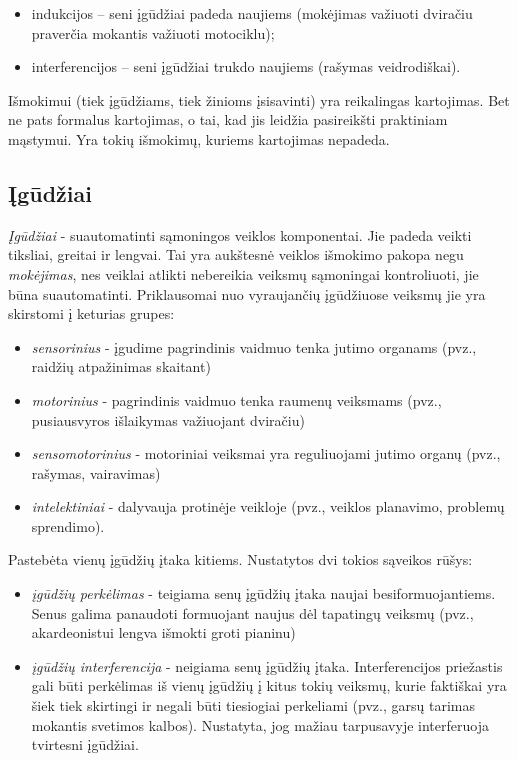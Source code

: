 \begin{itemize}
  \item indukcijos – seni įgūdžiai padeda naujiems (mokėjimas važiuoti
    dviračiu praverčia mokantis važiuoti motociklu);
  \item interferencijos – seni įgūdžiai trukdo naujiems (rašymas 
    veidrodiškai).
\end{itemize}


Išmokimui (tiek įgūdžiams, tiek žinioms įsisavinti) yra reikalingas 
kartojimas. Bet ne pats formalus kartojimas, o tai, kad jis leidžia
pasireikšti praktiniam mąstymui. Yra tokių išmokimų, kuriems kartojimas
nepadeda.

\subsection{Įgūdžiai}

\emph{Įgūdžiai} - suautomatinti sąmoningos veiklos komponentai. Jie padeda 
veikti tiksliai, greitai ir lengvai. Tai yra aukštesnė veiklos išmokimo 
pakopa negu \emph{mokėjimas}, nes veiklai atlikti nebereikia veiksmų 
sąmoningai kontroliuoti, jie būna suautomatinti. Priklausomai nuo 
vyraujančių įgūdžiuose veiksmų jie yra skirstomi į keturias grupes:
\begin{itemize}
  \item \emph{sensorinius} - įgudime pagrindinis vaidmuo tenka jutimo
  organams (pvz., raidžių atpažinimas skaitant)
  \item \emph{motorinius} - pagrindinis vaidmuo tenka raumenų veiksmams
  (pvz., pusiausvyros išlaikymas važiuojant dviračiu)
  \item \emph{sensomotorinius} - motoriniai veiksmai yra reguliuojami 
  jutimo organų (pvz., rašymas, vairavimas)
  \item \emph{intelektiniai} - dalyvauja protinėje veikloje (pvz., veiklos 
  planavimo, problemų sprendimo).
\end{itemize}

Pastebėta vienų įgūdžių įtaka kitiems. Nustatytos dvi tokios sąveikos rūšys:
\begin{itemize}
  \item \emph{įgūdžių perkėlimas} - teigiama senų įgūdžių įtaka naujai 
  besiformuojantiems. Senus galima panaudoti formuojant naujus dėl tapatingų
  veiksmų (pvz., akardeonistui lengva išmokti groti pianinu)
  \item \emph{įgūdžių interferencija} - neigiama senų įgūdžių įtaka. 
  Interferencijos priežastis gali būti perkėlimas iš vienų įgūdžių į kitus
  tokių veiksmų, kurie faktiškai yra šiek tiek skirtingi ir negali būti
  tiesiogiai perkeliami (pvz., garsų tarimas mokantis svetimos kalbos). 
  Nustatyta, jog mažiau tarpusavyje interferuoja tvirtesni įgūdžiai.
\end{itemize}

